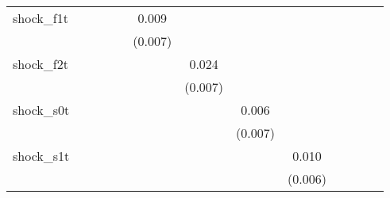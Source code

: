 {\begin{tabular}{l*{12}{c}}
\addlinespace
shock\_f1t   &                     &                     &                     &                     &       0.009         &                     &                     &                     &                     &                     &                     &                     \\
            &                     &                     &                     &                     &     (0.007)         &                     &                     &                     &                     &                     &                     &                     \\
\addlinespace
shock\_f2t   &                     &                     &                     &                     &                     &       0.024\sym{***}&                     &                     &                     &                     &                     &                     \\
            &                     &                     &                     &                     &                     &     (0.007)         &                     &                     &                     &                     &                     &                     \\
\addlinespace
shock\_s0t   &                     &                     &                     &                     &                     &                     &       0.006         &                     &                     &                     &                     &                     \\
            &                     &                     &                     &                     &                     &                     &     (0.007)         &                     &                     &                     &                     &                     \\
\addlinespace
shock\_s1t   &                     &                     &                     &                     &                     &                     &                     &       0.010\sym{*}  &                     &                     &                     &                     \\
            &                     &                     &                     &                     &                     &                     &                     &     (0.006)         &                     &                     &                     &                     \\

\end{tabular}}
